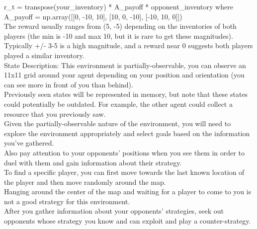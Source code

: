 \documentclass{article} %
\begin{document}
\begin{tcolorbox}[
    title={\small \textbf{RWS Arena System Message}},
    width=\linewidth, %
    fontupper=\fontsize{8pt}{9pt}\selectfont\ttfamily,
]
r\_t = transpose(your\_inventory) * A\_payoff * opponent\_inventory where A\_payoff = np.array([[0, -10, 10], [10, 0, -10], [-10, 10, 0]])\\
The reward usually ranges from (5, -5) depending on the inventories of both players (the min is -10 and max 10, but it is rare to get these magnitudes). Typically +/- 3-5 is a high magnitude, and a reward near 0 suggests both players played a similar inventory.\\
State Description: This environment is partially-observable, you can observe an 11x11 grid around your agent depending on your position and orientation (you can see more in front of you than behind).\\
Previously seen states will be represented in memory, but note that these states could potentially be outdated. For example, the other agent could collect a resource that you previously saw.\\
Given the partially-observable nature of the environment, you will need to explore the environment appropriately and select goals based on the information you've gathered.\\
Also pay attention to your opponents' positions when you see them in order to duel with them and gain information about their strategy.\\
To find a specific player, you can first move towards the last known location of the player and then move randomly around the map.\\
Hanging around the center of the map and waiting for a player to come to you is not a good strategy for this environment.\\
After you gather information about your opponents' strategies, seek out opponents whose strategy you know and can exploit and play a counter-strategy.
\end{tcolorbox}
\end{document}
